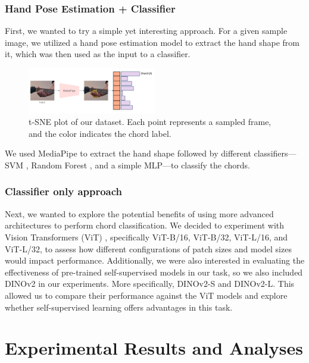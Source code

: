 \documentclass[10pt,twocolumn,letterpaper]{article}
\begin{document}
\subsubsection{Hand Pose Estimation + Classifier}
First, we wanted to try a simple yet interesting approach. For a given sample image, we utilized a hand pose estimation model to extract the hand shape from it, which was then used as the input to a classifier.

\begin{figure}[h]
    \centering
    \includegraphics[width=0.5\textwidth]{images/final/hand_pose_estimation_classifier.png}
    \caption{t-SNE plot of our dataset. Each point represents a sampled frame, and the color indicates the chord label. }
    \label{fig:ours-tsne-plot}
\end{figure}

We used MediaPipe to extract the hand shape followed by different classifiers—SVM \cite{cortes1995support}, Random Forest \cite{ho1995random}, and a simple MLP—to classify the chords.

\subsubsection{Classifier only approach}
Next, we wanted to explore the potential benefits of using more advanced architectures to perform chord classification. We decided to experiment with Vision Transformers (ViT) \cite{dosovitskiy2020image}, specifically ViT-B/16, ViT-B/32, ViT-L/16, and ViT-L/32, to assess how different configurations of patch sizes and model sizes would impact performance. Additionally, we were also interested in evaluating the effectiveness of pre-trained self-supervised models in our task, so we also included DINOv2 \cite{oquab2023dinov2} in our experiments. More specifically, DINOv2-S and DINOv2-L. This allowed us to compare their performance against the ViT models and explore whether self-supervised learning offers advantages in this task.

\section{Experimental Results and Analyses}
\label{sec:results}
\end{document}
